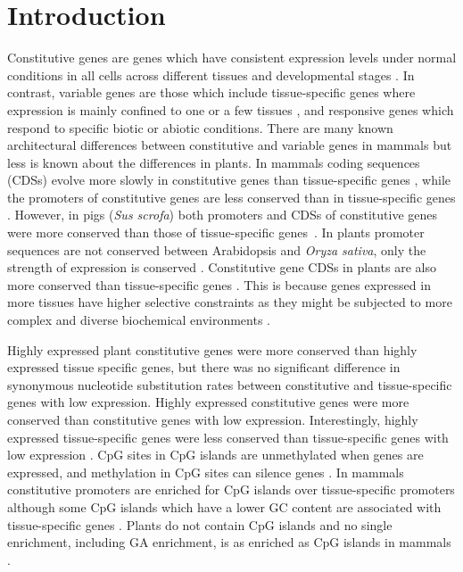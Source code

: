 \documentclass[../main.tex]{subfiles}
\begin{document}
\section{Introduction}
\label{chapter1:introduction}
Constitutive genes are genes which have consistent expression levels under normal conditions in all cells across different tissues and developmental stages \autocite{zhangMammalianHousekeepingGenes2004,butteFurtherDefiningHousekeeping2001}.
In contrast, variable genes are those which include tissue-specific genes where expression is mainly confined to one or a few tissues \autocite{butteFurtherDefiningHousekeeping2001,schugPromoterFeaturesRelated2005}, and responsive genes which respond to specific biotic or abiotic conditions.
There are many known architectural differences between constitutive and variable genes in mammals but less is known about the differences in plants.
In mammals coding sequences (CDSs) evolve more slowly in constitutive genes than tissue\hyp{}specific genes \autocite{zhangMammalianHousekeepingGenes2004}, while the promoters of constitutive genes are less conserved than in tissue-specific genes \autocite{farreHousekeepingGenesTend2007,carninciGenomewideAnalysisMammalian2006}.
However, in pigs (\textit{Sus scrofa}) both promoters and CDSs of constitutive genes were more conserved than those of tissue-specific genes~\autocite{weiCharacterizationGenePromoters2019}.
In plants promoter sequences are not conserved between Arabidopsis and \textit{Oryza sativa}, only the strength of expression is conserved \autocite{armisenUniqueGenesPlants2008}.
Constitutive gene CDSs in plants are also more conserved than tissue-specific genes \autocite{armisenUniqueGenesPlants2008,wrightEffectsGeneExpression2004,mukhopadhyayDifferentialSelectiveConstraints2008}.
This is because genes expressed in more tissues have higher selective constraints \autocite{wrightEffectsGeneExpression2004} as they might be subjected to more complex and diverse biochemical environments \autocite{kumaFunctionalConstraintsVariations1995}.

Highly expressed plant constitutive genes were more conserved than highly expressed tissue specific genes, but there was no significant difference in synonymous nucleotide substitution rates between constitutive and tissue-specific genes with low expression.
Highly expressed constitutive genes were more conserved than constitutive genes with low expression.
Interestingly, highly expressed tissue-specific genes were less conserved than tissue-specific genes with low expression \autocite{mukhopadhyayDifferentialSelectiveConstraints2008}.
CpG sites in CpG islands are unmethylated when genes are expressed, and methylation in CpG sites can silence genes \autocite{birdDNAMethylationPatterns2002}.
In mammals constitutive promoters are enriched for CpG islands over tissue-specific promoters \autocite{carninciGenomewideAnalysisMammalian2006} although some CpG islands which have a lower GC content are associated with tissue-specific genes \autocite{mendizabalWholegenomeBisulfiteSequencing2016}.
Plants do not contain CpG islands \autocite{kapranovTranscriptionStartSite2009} and no single enrichment, including GA enrichment, is as enriched as CpG islands in mammals \autocite{megrawTranscriptionFactorAffinitybased2009}.
\end{document}
